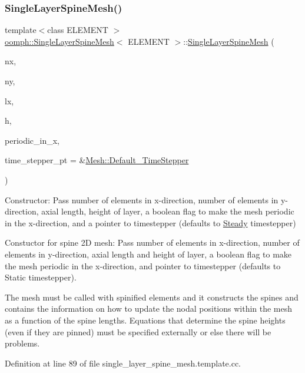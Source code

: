 \subsubsection{\texorpdfstring{Single\+Layer\+Spine\+Mesh()}{SingleLayerSpineMesh()}\hspace{0.1cm}{\footnotesize\ttfamily [2/2]}}
{\footnotesize\ttfamily template$<$class E\+L\+E\+M\+E\+NT $>$ \\
\hyperlink{classoomph_1_1SingleLayerSpineMesh}{oomph\+::\+Single\+Layer\+Spine\+Mesh}$<$ E\+L\+E\+M\+E\+NT $>$\+::\hyperlink{classoomph_1_1SingleLayerSpineMesh}{Single\+Layer\+Spine\+Mesh} (\begin{DoxyParamCaption}\item[{const unsigned \&}]{nx,  }\item[{const unsigned \&}]{ny,  }\item[{const double \&}]{lx,  }\item[{const double \&}]{h,  }\item[{const bool \&}]{periodic\+\_\+in\+\_\+x,  }\item[{\hyperlink{classoomph_1_1TimeStepper}{Time\+Stepper} $\ast$}]{time\+\_\+stepper\+\_\+pt = {\ttfamily \&\hyperlink{classoomph_1_1Mesh_a12243d0fee2b1fcee729ee5a4777ea10}{Mesh\+::\+Default\+\_\+\+Time\+Stepper}} }\end{DoxyParamCaption})}



Constructor\+: Pass number of elements in x-\/direction, number of elements in y-\/direction, axial length, height of layer, a boolean flag to make the mesh periodic in the x-\/direction, and a pointer to timestepper (defaults to \hyperlink{classoomph_1_1Steady}{Steady} timestepper) 

Constuctor for spine 2D mesh\+: Pass number of elements in x-\/direction, number of elements in y-\/direction, axial length and height of layer, a boolean flag to make the mesh periodic in the x-\/direction, and pointer to timestepper (defaults to Static timestepper).

The mesh must be called with spinified elements and it constructs the spines and contains the information on how to update the nodal positions within the mesh as a function of the spine lengths. Equations that determine the spine heights (even if they are pinned) must be specified externally or else there will be problems. 

Definition at line 89 of file single\+\_\+layer\+\_\+spine\+\_\+mesh.\+template.\+cc.




